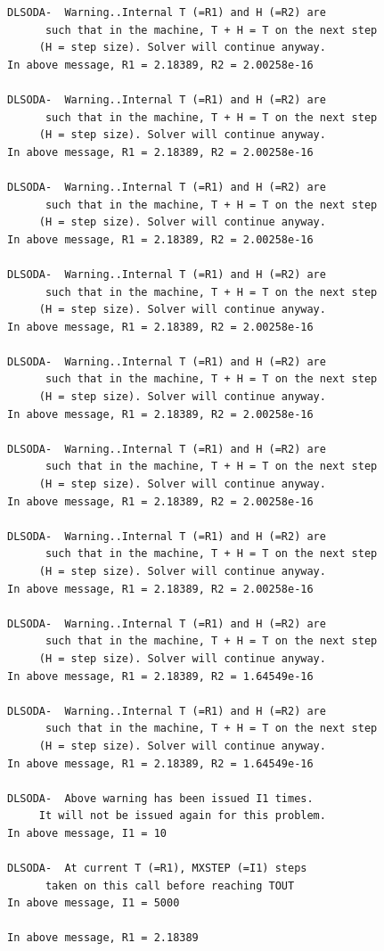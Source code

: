 \documentclass[Tutorial]{../cbg}\usepackage[]{graphicx}\usepackage[]{color}
\makeatletter
\newenvironment{kframe}{%
 \def\at@end@of@kframe{}%
 \ifinner\ifhmode%
  \def\at@end@of@kframe{\end{minipage}}%
  \begin{minipage}{\columnwidth}%
 \fi\fi%
 \def\FrameCommand##1{\hskip\@totalleftmargin \hskip-\fboxsep
 \colorbox{shadecolor}{##1}\hskip-\fboxsep
     \hskip-\linewidth \hskip-\@totalleftmargin \hskip\columnwidth}%
 \MakeFramed {\advance\hsize-\width
   \@totalleftmargin\z@ \linewidth\hsize
   \@setminipage}}%
 {\par\unskip\endMakeFramed%
 \at@end@of@kframe}
\newenvironment{knitrout}{}{} %
\makeatother
\begin{document}
\begin{knitrout}
\begin{kframe}
\begin{verbatim}
DLSODA-  Warning..Internal T (=R1) and H (=R2) are
      such that in the machine, T + H = T on the next step  
     (H = step size). Solver will continue anyway.
In above message, R1 = 2.18389, R2 = 2.00258e-16
 
DLSODA-  Warning..Internal T (=R1) and H (=R2) are
      such that in the machine, T + H = T on the next step  
     (H = step size). Solver will continue anyway.
In above message, R1 = 2.18389, R2 = 2.00258e-16
 
DLSODA-  Warning..Internal T (=R1) and H (=R2) are
      such that in the machine, T + H = T on the next step  
     (H = step size). Solver will continue anyway.
In above message, R1 = 2.18389, R2 = 2.00258e-16
 
DLSODA-  Warning..Internal T (=R1) and H (=R2) are
      such that in the machine, T + H = T on the next step  
     (H = step size). Solver will continue anyway.
In above message, R1 = 2.18389, R2 = 2.00258e-16
 
DLSODA-  Warning..Internal T (=R1) and H (=R2) are
      such that in the machine, T + H = T on the next step  
     (H = step size). Solver will continue anyway.
In above message, R1 = 2.18389, R2 = 2.00258e-16
 
DLSODA-  Warning..Internal T (=R1) and H (=R2) are
      such that in the machine, T + H = T on the next step  
     (H = step size). Solver will continue anyway.
In above message, R1 = 2.18389, R2 = 2.00258e-16
 
DLSODA-  Warning..Internal T (=R1) and H (=R2) are
      such that in the machine, T + H = T on the next step  
     (H = step size). Solver will continue anyway.
In above message, R1 = 2.18389, R2 = 2.00258e-16
 
DLSODA-  Warning..Internal T (=R1) and H (=R2) are
      such that in the machine, T + H = T on the next step  
     (H = step size). Solver will continue anyway.
In above message, R1 = 2.18389, R2 = 1.64549e-16
 
DLSODA-  Warning..Internal T (=R1) and H (=R2) are
      such that in the machine, T + H = T on the next step  
     (H = step size). Solver will continue anyway.
In above message, R1 = 2.18389, R2 = 1.64549e-16
 
DLSODA-  Above warning has been issued I1 times.  
     It will not be issued again for this problem.
In above message, I1 = 10
 
DLSODA-  At current T (=R1), MXSTEP (=I1) steps   
      taken on this call before reaching TOUT     
In above message, I1 = 5000
 
In above message, R1 = 2.18389
 
\end{verbatim}
\end{kframe}
\end{knitrout}
\end{document}
